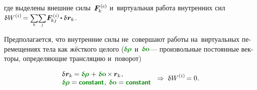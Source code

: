 \begin{otherlanguage}{russian}
\vspace{-0.1em}\noindent
где выделены внешние силы~${\bm{F}^{\smthexternal}_{\hspace{-0.16ex}k}}$ и~виртуальная работа внутренних сил
${\variation{\internalwork} \hspace{-0.12ex} = \scalebox{0.8}[0.84]{$\displaystyle \underset{\raisemath{.25ex}{\smash{k}}}{\sum}$} \scalebox{0.8}[0.84]{$\displaystyle \underset{\raisemath{.25ex}{\smash{j}}}{\sum}$} \hspace{.12ex} \bm{F}^{\smthinternal}_{\hspace{-0.16ex}kj} \hspace{-0.1ex} \dotp \variation{\hspace{.1ex}\locationvector_k} \hspace{.1ex}}$.

\vspace{-0.1em}
Предполагается, что внутренние силы не~совершают работы на~виртуальных перемещениях тела как жёсткого целого (${\constvarvector{\hspace{-0.1ex}\bm{\rho}}}$ и~${\constvarvector{\bm{o}}}$\:--- произвольные постоянные векторы, определяющие трансляцию и~поворот)

\nopagebreak\vspace{-0.2em}\begin{equation}\label{assumptionforvirtualwork}
\begin{array}{l}
\variation{\hspace{.1ex}\locationvector_k} \hspace{-0.16ex}
= \constvarvector{\hspace{-0.1ex}\bm{\rho}} \hspace{.2ex} + \hspace{.12ex} \constvarvector{\bm{o}} \hspace{-0.2ex} \times \hspace{-0.1ex} \locationvector_k
\hspace{.1ex} ,
\\
\constvarvector{\hspace{-0.1ex}\bm{\rho}} = \boldconstant \hspace{.1ex} , \:
\constvarvector{\bm{o}} = \boldconstant
\end{array}
\hspace{.3ex} \Rightarrow \hspace{.6ex}
\variation{\internalwork} \hspace{-0.1ex} = 0 \hspace{.1ex}.
\end{equation}


\end{otherlanguage}
